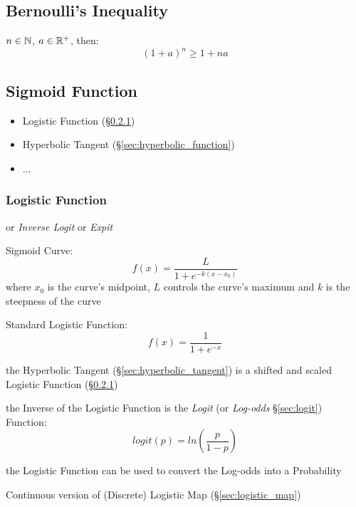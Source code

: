 \subsection{Bernoulli's Inequality}\label{sec:bernoullis_inequality}

$n \in \mathbb{N}$, $a \in \mathbb{R}^+$, then:
\[
  (1 + a)^n \geq 1 + n a
\]


\subsection{Sigmoid Function}\label{sec:sigmoid_function}

\begin{itemize}
  \item Logistic Function (\S\ref{sec:logistic_function})
  \item Hyperbolic Tangent (\S\ref{sec:hyperbolic_function})
  \item ...
\end{itemize}



\subsubsection{Logistic Function}\label{sec:logistic_function}


or \emph{Inverse Logit} or \emph{Expit}

Sigmoid Curve:
\[
  f(x) = \frac{L}{1 + e^{-k(x-x_0)}}
\]
where $x_0$ is the curve's midpoint, $L$ controls the curve's maximum and $k$ is
the steepness of the curve

Standard Logistic Function:
\[
  f(x) = \frac{1}{1 + e^{-x}}
\]

the Hyperbolic Tangent (\S\ref{sec:hyperbolic_tangent}) is a shifted and scaled
Logistic Function (\S\ref{sec:logistic_function})

the Inverse of the Logistic Function is the \emph{Logit} (or \emph{Log-odds}
\S\ref{sec:logit}) Function:
\[
  logit(p) = ln (\frac{p}{1-p})
\]

the Logistic Function can be used to convert the Log-odds into a Probability

\fist Continuous version of (Discrete) Logistic Map (\S\ref{sec:logistic_map})


